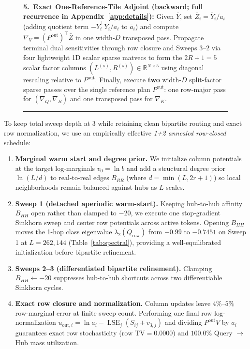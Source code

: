 \documentclass[11pt]{article}
\begin{document}
\begin{figure}[t]
\begin{minipage}{\linewidth}
  \textbf{5.\ Exact One-Reference-Tile Adjoint (backward; full recurrence in Appendix~\ref{app:details}):}
  Given $\bar{Y}$, set $\bar{Z}_i = \bar{Y}_i / a_i$ (adding quotient term $-\bar{Y}_i^\top Y_i / a_i$ to $\bar{a}_i$) and compute $\nabla_V = (P^{\text{out}})^\top \bar{Z}$ in one width-$D$ transposed pass. Propagate terminal dual sensitivities through row closure and Sweeps 3--2 via four lightweight 1D scalar sparse matvecs to form the $2R+1=5$ scalar factor columns $(L^{(s)}, R^{(s)}) \in \mathbb{R}^{N \times 5}$ using diagonal rescaling relative to $P^{\text{out}}$. Finally, execute \textbf{two} width-$D$ split-factor sparse passes over the single reference plan $P^{\text{out}}$: one row-major pass for $(\nabla_Q, \nabla_B)$ and one transposed pass for $\nabla_K$.
  \end{minipage}
  \vspace{0.3em}
  \rule{\linewidth}{0.8pt}
\end{figure}

To keep total sweep depth at $3$ while retaining clean bipartite routing and exact row normalization, we use an empirically effective \emph{1+2 annealed row-closed} schedule:
\begin{enumerate}[leftmargin=1.5em]
  \item \textbf{Marginal warm start and degree prior.} We initialize column potentials at the target log-marginals $v_0 = \ln b$ \citep{thornton2023initialization} and add a structural degree prior $\ln(L/d)$ to real-to-real edges $B_{RR}$ (where $d=\min(L,2r+1)$) so local neighborhoods remain balanced against hubs as $L$ scales.
  \item \textbf{Sweep 1 (detached aperiodic warm-start).} Keeping hub-to-hub affinity $B_{HH}$ open rather than clamped to $-20$, we execute one stop-gradient Sinkhorn sweep and center row potentials across active tokens. Opening $B_{HH}$ moves the 1-hop class eigenvalue $\lambda_2(Q_{\text{row}})$ from $-0.99$ to $-0.7451$ on Sweep 1 at $L=262{,}144$ (Table~\ref{tab:spectral}), providing a well-equilibrated initialization before bipartite refinement.
  \item \textbf{Sweeps 2--3 (differentiated bipartite refinement).} Clamping $B_{HH} \leftarrow -20$ suppresses hub-to-hub shortcuts across two differentiable Sinkhorn cycles.
  \item \textbf{Exact row closure and normalization.} Column updates leave $4\%$--$5\%$ row-marginal error at finite sweep count. Performing one final row log-normalization $u_{\text{out},i} = \ln a_i - \operatorname{LSE}_j(S_{ij} + v_{3,j})$ and dividing $P^{\text{out}} V$ by $a_i$ guarantees exact row stochasticity ($\text{row TV} = 0.0000$) and $100.0\%$ Query $\to$ Hub mass utilization.
\end{enumerate}
\end{document}
